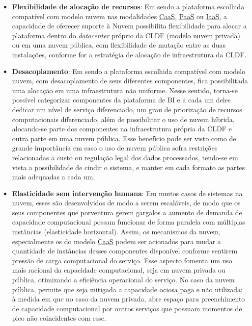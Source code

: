     \begin{itemize}
        \item \textbf{Flexibilidade de alocação de recursos}: Em sendo a plataforma escolhida compatível com modelo nuvem nas modalidades \hyperref[caas]{CaaS}, \hyperref[paas]{PaaS} ou \hyperref[iaas]{IaaS}, a capacidade de oferecer suporte à Nuvem possibilita flexibilidade para alocar a plataforma dentro do \emph{datacenter} próprio da CLDF (modelo nuvem privada) ou em uma nuvem pública, com flexibilidade de mutação entre as duas instalações, conforme for a estratégia de alocação de infraestrutura da CLDF.
        
        \item \textbf{Desacoplamento}: Em sendo a plataforma escolhida compatível com modelo nuvem, com desacoplamento de seus diferentes componentes, fica possibilitada uma alocação em uma infraestrutura não uniforme. Nesse sentido, torna-se possível categorizar componentes da plataforma de BI e a cada um deles dedicar um nível de serviço diferenciado, um grau de priorização de recursos computacionais diferenciado, além de possibilitar o uso de nuvem híbrida, alocando-se parte dos componentes na infraestrutura própria da CLDF e outra parte em uma nuvem pública. Esse benefício pode ser visto como de grande importância em caso o uso de nuvem pública sofra restrições relacionadas a custo ou regulação legal dos dados processados, tendo-se em vista a possibilidade de cindir o sistema, e manter em cada formato as partes mais adequadas a cada um.
        
        \item \textbf{Elasticidade sem intervenção humana}: Em muitos casos de sistemas na nuvem, esses são desenvolvidos de modo a serem escaláveis, de modo que os seus componentes que porventura gerem gargalos a aumento de demanda de capacidade computacional possam funcionar de forma paralela com múltiplas instâncias (elasticidade horizontal). Assim, os mecanismos da nuvem, especialmente os do modelo \hyperref[caas]{CaaS} podem ser acionados para mudar a quantidade de instâncias desses componentes disponível conforme sentirem pressão de carga computacional do serviço. Esse aspecto fomenta um uso mais racional da capacidade computacional, seja em nuvem privada ou pública, otimizando a eficiência operacional do serviço. No caso da nuvem pública, permite que seja mitigada a capacidade ociosa paga e não utilizada; à medida em que no caso da nuvem privada, abre espaço para preenchimento de capacidade computacional por outros serviços que possuam momentos de pico não coincidentes com esse.
    

\end{itemize}
